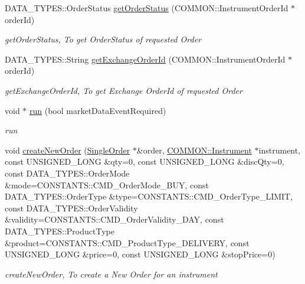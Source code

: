 \begin{DoxyCompactItemize}
D\-A\-T\-A\-\_\-\-T\-Y\-P\-E\-S\-::\-Order\-Status \hyperlink{class_a_p_i2_1_1_s_g_context_a908e0a9ae6e276117fa661957b2cfa1f}{get\-Order\-Status} (C\-O\-M\-M\-O\-N\-::\-Instrument\-Order\-Id $\ast$order\-Id)
\begin{DoxyCompactList}\small\item\em get\-Order\-Status, To get Order\-Status of requested Order \end{DoxyCompactList}\item 
D\-A\-T\-A\-\_\-\-T\-Y\-P\-E\-S\-::\-String \hyperlink{class_a_p_i2_1_1_s_g_context_a1f069a29ffd8d51cd8bbb512f9d57406}{get\-Exchange\-Order\-Id} (C\-O\-M\-M\-O\-N\-::\-Instrument\-Order\-Id $\ast$order\-Id)
\begin{DoxyCompactList}\small\item\em get\-Exchange\-Order\-Id, To get Exchange Order\-Id of requested Order \end{DoxyCompactList}\item 
void $\ast$ \hyperlink{class_a_p_i2_1_1_s_g_context_a526eb681e4458ff0855195dbf360e5dd}{run} (bool market\-Data\-Event\-Required)
\begin{DoxyCompactList}\small\item\em run \end{DoxyCompactList}\item 
void \hyperlink{class_a_p_i2_1_1_s_g_context_ab141f05e2a0d8a51fdadc57bf53d2cd8}{create\-New\-Order} (\hyperlink{class_a_p_i2_1_1_single_order}{Single\-Order} $\ast$\&order, \hyperlink{class_a_p_i2_1_1_c_o_m_m_o_n_1_1_instrument}{C\-O\-M\-M\-O\-N\-::\-Instrument} $\ast$instrument, const U\-N\-S\-I\-G\-N\-E\-D\-\_\-\-L\-O\-N\-G \&qty=0, const U\-N\-S\-I\-G\-N\-E\-D\-\_\-\-L\-O\-N\-G \&disc\-Qty=0, const D\-A\-T\-A\-\_\-\-T\-Y\-P\-E\-S\-::\-Order\-Mode \&mode=C\-O\-N\-S\-T\-A\-N\-T\-S\-::\-C\-M\-D\-\_\-\-Order\-Mode\-\_\-\-B\-U\-Y, const D\-A\-T\-A\-\_\-\-T\-Y\-P\-E\-S\-::\-Order\-Type \&type=C\-O\-N\-S\-T\-A\-N\-T\-S\-::\-C\-M\-D\-\_\-\-Order\-Type\-\_\-\-L\-I\-M\-I\-T, const D\-A\-T\-A\-\_\-\-T\-Y\-P\-E\-S\-::\-Order\-Validity \&validity=C\-O\-N\-S\-T\-A\-N\-T\-S\-::\-C\-M\-D\-\_\-\-Order\-Validity\-\_\-\-D\-A\-Y, const D\-A\-T\-A\-\_\-\-T\-Y\-P\-E\-S\-::\-Product\-Type \&product=C\-O\-N\-S\-T\-A\-N\-T\-S\-::\-C\-M\-D\-\_\-\-Product\-Type\-\_\-\-D\-E\-L\-I\-V\-E\-R\-Y, const U\-N\-S\-I\-G\-N\-E\-D\-\_\-\-L\-O\-N\-G \&price=0, const U\-N\-S\-I\-G\-N\-E\-D\-\_\-\-L\-O\-N\-G \&stop\-Price=0)
\begin{DoxyCompactList}\small\item\em create\-New\-Order, To create a New Order for an instrument \end{DoxyCompactList}\item 

\end{DoxyCompactItemize}

